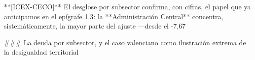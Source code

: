 \documentclass[10pt,a4paper]{article}
\begin{document}
**[ICEX-CECO]** El desglose por subsector confirma, con cifras, el papel que ya anticipamos en el epígrafe 1.3: la **Administración Central** concentra, sistemáticamente, la mayor parte del ajuste —desde el -7,67%

### La deuda por subsector, y el caso valenciano como ilustración extrema de la desigualdad territorial
\end{document}

